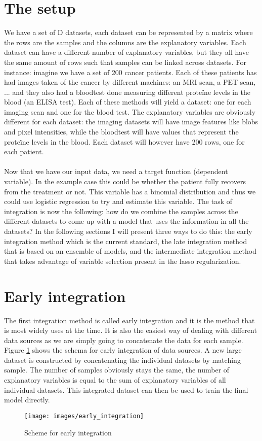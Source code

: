 \section{The setup}
We have a set of D datasets, each dataset can be represented by a matrix where the rows are the samples and the columns are the explanatory variables. Each dataset can have a different number of explanatory variables, but they all have the same amount of rows such that samples can be linked across datasets. For instance: imagine we have a set of 200 cancer patients. Each of these patients has had images taken of the cancer by different machines: an MRI scan, a PET scan, ... and they also had a bloodtest done measuring different prote\"{i}ne levels in the blood (an ELISA test). Each of these methods will yield a dataset: one for each imaging scan and one for the blood test. The explanatory variables are obviously different for each dataset: the imaging datasets will have image features like blobs and pixel intensities, while the bloodtest will have values that represent the prote\"{i}ne levels in the blood. Each dataset will however have 200 rows, one for each patient. \\ \\
Now that we have our input data, we need a target function (dependent variable). In the example case this could be whether the patient fully recovers from the treatment or not. This variable has a binomial distribution and thus we could use logistic regression to try and estimate this variable. The task of integration is now the following: how do we combine the samples across the different datasets to come up with a model that uses the information in all the datasets? In the following sections I will present three ways to do this: the early integration method which is the current standard, the late integration method that is based on an ensemble of models, and the intermediate integration method that takes advantage of variable selection present in the lasso regularization.

\section{Early integration}
\label{sec:integration-early}
The first integration method is called early integration and it is the method that is most widely uses at the time. It is also the easiest way of dealing with different data sources as we are simply going to concatenate the data for each sample. Figure \ref{fig:integration-early} shows the schema for early integration of data sources. A new large dataset is constructed by concatenating the individual datasets by matching sample. The number of samples obviously stays the same, the number of explanatory variables is equal to the sum of explanatory variables of all individual datasets. This integrated dataset can then be used to train the final model directly.
\begin{figure}
	\centering
	\texttt{[image: images/early\_integration]}
	\caption{Scheme for early integration}
	\label{fig:integration-early}
\end{figure}
